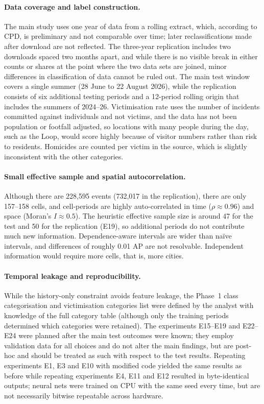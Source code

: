 \documentclass[11pt,a4paper]{report}
\begin{document}
\paragraph{Data coverage and label construction.} The main study uses one year of data from a rolling extract, which, according to CPD, is preliminary and not comparable over time; later reclassifications made after download are not reflected. The three-year replication includes two downloads spaced two months apart, and while there is no visible break in either counts or shares at the point where the two data sets are joined, minor differences in classification of data cannot be ruled out. The main test window covers a single summer (28 June to 22 August 2026), while the replication consists of six additional testing periods and a 12-period rolling origin that includes the summers of 2024--26. Victimisation rate uses the number of incidents committed against individuals and not victims, and the data has not been population or footfall adjusted, so locations with many people during the day, such as the Loop, would score highly because of visitor numbers rather than risk to residents. Homicides are counted per victim in the source, which is slightly inconsistent with the other categories.


\paragraph{Small effective sample and spatial autocorrelation.} Although there are 228,595 events (732,017 in the replication), there are only 157--158 cells, and cell-periods are highly auto-correlated in time ($\rho\approx0.96$) and space (Moran's $I\approx0.5$). The heuristic effective sample size is around 47 for the test and 50 for the replication (E19), so additional periods do not contribute much new information. Dependence-aware intervals are wider than naïve intervals, and differences of roughly 0.01 AP are not resolvable. Independent information would require more cells, that is, more cities.

\paragraph{Temporal leakage and reproducibility.} While the history-only constraint avoids feature leakage, the Phase~1 class categorisation and victimisation categories list were defined by the analyst with knowledge of the full category table (although only the training periods determined which categories were retained). The experiments E15--E19 and E22--E24 were planned after the main test outcomes were known; they employ validation data for all choices and do not alter the main findings, but are post-hoc and should be treated as such with respect to the test results. Repeating experiments E1, E3 and E10 with modified code yielded the same results as before while repeating experiments E4, E11 and E12 resulted in byte-identical outputs; neural nets were trained on CPU with the same seed every time, but are not necessarily bitwise repeatable across hardware.
\end{document}
